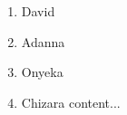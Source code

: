 \documentclass{article}
\begin{document}
	
	\begin{enumerate}
		\item David
		\item Adanna
		\item Onyeka
		\item Chizara
		content...
	\end{enumerate}
	
\end{document}
